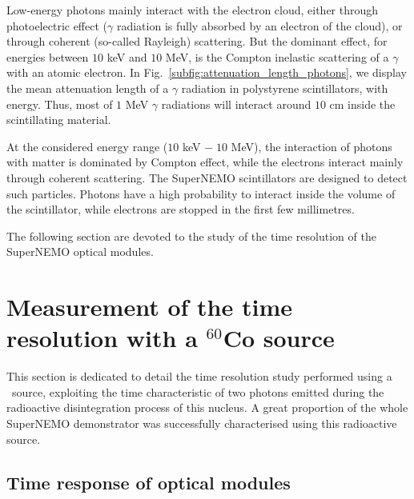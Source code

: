 Low-energy photons mainly interact with the electron cloud, either through photoelectric effect ($\gamma$ radiation is fully absorbed by an electron of the cloud), or through coherent (so-called Rayleigh) scattering.
But the dominant effect, for energies between $10$ keV and $10$ MeV, is the Compton inelastic scattering of a $\gamma$ with an atomic electron.
In Fig.~\ref{subfig:attenuation_length_photons}, we display the mean attenuation length of a $\gamma$ radiation in polystyrene scintillators, with energy.
Thus, most of $1$ MeV $\gamma$ radiations will interact around $10$ cm inside the scintillating material.

At the considered energy range ($10$ keV $ -\; 10$ MeV), the interaction of photons with matter is dominated by Compton effect, while the electrons interact mainly through coherent scattering.
The SuperNEMO scintillators are designed to detect such particles.
Photons have a high probability to interact inside the volume of the scintillator, while electrons are stopped in the first few millimetres.

The following section are devoted to the study of the time resolution of the SuperNEMO optical modules.



\section{Measurement of the time resolution with a $^{60}$Co source}
\label{sec:Co_analysis}
This section is dedicated to detail the time resolution study performed using a \Co\ source, exploiting the time characteristic of two photons emitted during the radioactive disintegration process of this nucleus.
A great proportion of the whole SuperNEMO demonstrator was successfully characterised using this radioactive source.

\subsection{Time response of optical modules}
\label{subsec:OMtimeResponse}

